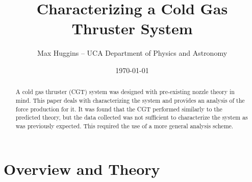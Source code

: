 \documentclass[letterpaper,12pt]{article}
\begin{document}
\title{Characterizing a Cold Gas Thruster System}
\author{Max Huggins – UCA Department of Physics and Astronomy}
\date{\today}
\maketitle

\begin{abstract}
A cold gas thruster (CGT) system was designed with pre-existing nozzle theory in mind. This paper deals with characterizing the system and provides an analysis of the force production for it. It was found that the CGT performed similarly to the predicted theory, but the data collected was not sufficient to characterize the system as was previously expected. This required the use of a more general analysis scheme.
\end{abstract}
\section{Overview and Theory}
\end{document}
